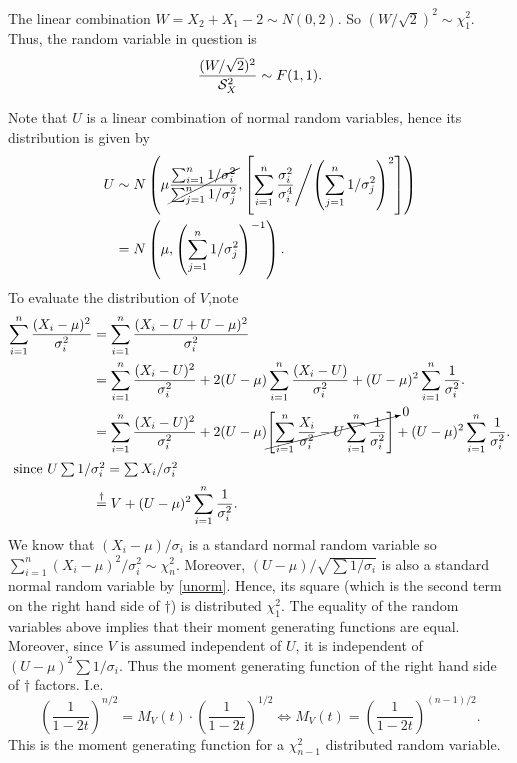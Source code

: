 \documentclass{stat_homework}
\begin{document}

The linear combination $W=X_2 + X_1 -2 \sim N(0,2)$. So $(W/\sqrt 2)^2 \sim \chi^2_1$. Thus, the random variable in question is
$$
  \frac{(W/\sqrt2)^2}{\mathcal S_X^2}\sim F(1,1).
$$ 
\newpage


\begin{solution}
  Note that $U$ is a linear combination of normal random variables, hence its distribution is given by 
  \begin{align}
    U&\sim N\left( \mu\cancel{\frac{\sum_{i=1}^n 1/\sigma_i^2}{\sum_{j=1}^n 1/\sigma_j^2}},\left[ \sum_{i=1}^n \frac{\sigma_i^2}{\sigma_i^4} \middle/ \left(\sum_{j=1}^n 1/\sigma_j^2 \right)^2 \right] \right) \nonumber\\
    &= N\left( \mu ,\left( \sum_{j=1}^n 1/\sigma_j^2 \right)^{-1}  \right). \label{unorm}
  \end{align}
  To evaluate the distribution of $V$,note 
  \begin{align*}
  \sum_{i=1}^n\frac{(X_i-\mu)^2}{\sigma_i^2}
    &= \sum_{i=1}^n\frac{(X_i - U + U - \mu)^2}{\sigma_i^2}\\
    &= \sum_{i=1}^n\frac{(X_i - U)^2}{\sigma_i^2} + 2(U - \mu)\sum_{i=1}^n\frac{(X_i - U)}{\sigma_i^2} + (U - \mu)^2\sum_{i=1}^n \frac{1}{\sigma_i^2}. \\
    &= \sum_{i=1}^n\frac{(X_i - U)^2}{\sigma_i^2} + 2(U - \mu)\cancelto{0}{\left[\sum_{i=1}^n\frac{X_i}{\sigma_i^2} - U\sum_{i=1}^n\frac{1}{\sigma_i^2}\right]} + (U - \mu)^2\sum_{i=1}^n \frac{1}{\sigma_i^2}. \\
\intertext{ since $U \sum{1/\sigma_i^2} = \sum X_i/\sigma_i^2$}
    &\stackrel{\dagger}{=} V + (U - \mu)^2\sum_{i=1}^n \frac{1}{\sigma_i^2}. \\
\end{align*}
We know that $(X_i-\mu)/\sigma_i$ is a standard normal random variable so $\sum_{i=1}^n(X_i-\mu)^2/\sigma_i^2\sim \chi^2_n$.  Moreover, $(U-\mu)/\sqrt{\sum 1/\sigma_i}$ is also a standard normal random variable by \eqref{unorm}. Hence, its square (which is the second term on the right hand side of $\dagger$)  is distributed $\chi^2_1$.  The equality of the random variables above implies that their moment generating functions are equal.  Moreover, since $V$ is assumed independent of $U$, it is independent of $(U- \mu)^2\sum1/\sigma_i$.  Thus the moment generating function of the right hand side of $\dagger$ factors. I.e.
{\small
$$
  \left(\frac{1}{1-2t}\right)^{n/2} = M_V(t) \cdot \left(\frac{1}{1-2t}\right)^{1/2} \iff
  M_V(t) = \left(\frac{1}{1-2t} \right)^{(n-1)/2}.
$$
}
This is the moment generating function for a $\chi^2_{n-1}$ distributed random variable.
\end{solution}
\newpage
\end{document}
